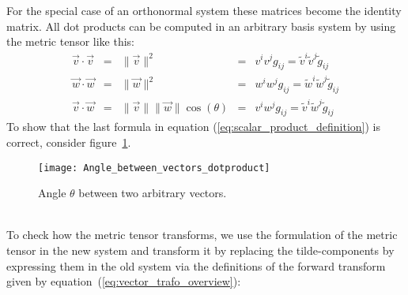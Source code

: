 For the special case of an orthonormal system these matrices become the identity matrix.
All dot products can be computed in an arbitrary basis system by using the metric tensor
like this:
\begin{equation}
    \label{eq:scalar_product_definition}
    \begin{array}{rclrcl}
        \vec{v} \cdot \vec{v} & = & \|\vec{v}\|^2 & = & v^i v^j g_{ij} = \tilde{v}^i \tilde{v}^j \tilde{g}_{ij} \\
        \vec{w} \cdot \vec{w} & = & \|\vec{w}\|^2 & = & w^i w^j g_{ij} = \tilde{w}^i \tilde{w}^j \tilde{g}_{ij} \\
        \vec{v} \cdot \vec{w} & = & \|\vec{v}\|  \|\vec{w}\| \cos(\theta) & = & v^i w^j g_{ij}  = \tilde{v}^i \tilde{w}^j \tilde{g}_{ij}
    \end{array}
\end{equation}
To show that the last formula in equation (\ref{eq:scalar_product_definition}) is correct,
consider figure~\ref{fig:angle_between_arbitrary_vectors}.
\begin{figure}[h]
    \centering
    \texttt{[image: Angle\_between\_vectors\_dotproduct]}
    \caption{Angle $\theta$ between two arbitrary vectors.}
    \label{fig:angle_between_arbitrary_vectors}
\end{figure} \\

To check how the metric tensor transforms, we use the formulation of the metric tensor in
the new system and transform it by replacing the tilde-components by expressing them in
the old system via the definitions of the forward transform given by
equation~(\ref{eq:vector_trafo_overview}):

